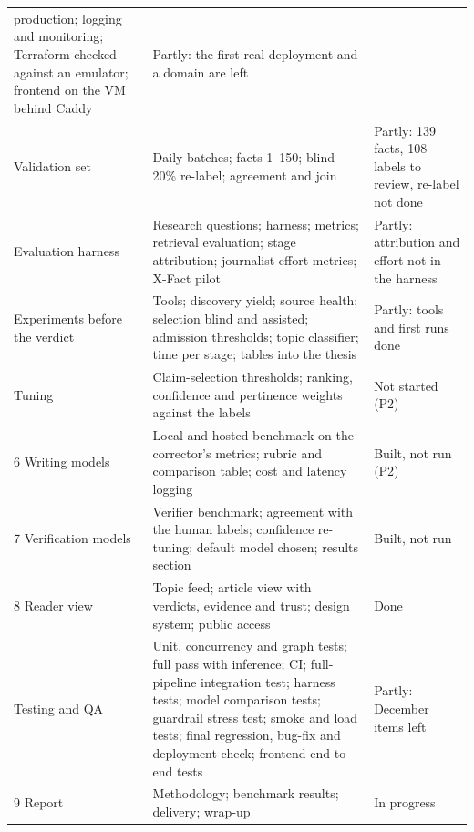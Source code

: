 {\begin{longtable}{@{}p{2.6cm}p{9.4cm}p{1.6cm}@{}}
production; logging and monitoring; Terraform checked against an
emulator; frontend on the VM behind Caddy & Partly: the first real
deployment and a domain are left \\
Validation set & Daily batches; facts 1--150; blind 20\% re-label;
agreement and join & Partly: 139 facts, 108 labels to review, re-label
not done \\
Evaluation harness & Research questions; harness; metrics; retrieval
evaluation; stage attribution; journalist-effort metrics; X-Fact pilot
& Partly: attribution and effort not in the harness \\
Experiments before the verdict & Tools; discovery yield; source health;
selection blind and assisted; admission thresholds; topic classifier;
time per stage; tables into the thesis & Partly: tools and first runs
done \\
Tuning & Claim-selection thresholds; ranking, confidence and pertinence
weights against the labels & Not started (P2) \\
6 Writing models & Local and hosted benchmark on the corrector's
metrics; rubric and comparison table; cost and latency logging &
Built, not run (P2) \\
7 Verification models & Verifier benchmark; agreement with the human
labels; confidence re-tuning; default model chosen; results section &
Built, not run \\
8 Reader view & Topic feed; article view with verdicts, evidence and
trust; design system; public access & Done \\
Testing and QA & Unit, concurrency and graph tests; full pass with
inference; CI; full-pipeline integration test; harness tests; model
comparison tests; guardrail stress test; smoke and load tests; final
regression, bug-fix and deployment check; frontend end-to-end tests &
Partly: December items left \\
9 Report & Methodology; benchmark results; delivery; wrap-up & In
progress \\
\end{longtable}
}
